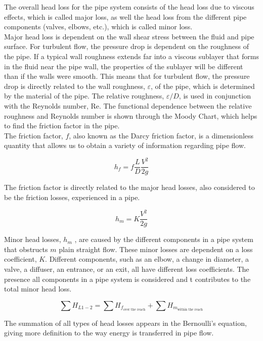 \documentclass{article}
\begin{document}
\noindent The overall head loss for the pipe system consists of the head loss due to viscous effects, which is called major loss, as well the head loss from the different pipe components (valves, elbows, etc.), which is called minor loss.\\

\noindent Major head loss is dependent on the wall shear stress between the fluid and pipe surface. For turbulent flow, the pressure drop is dependent on the roughness of the pipe. If a typical wall roughness extends far into a viscous sublayer that forms in the fluid near the pipe wall, the properties of the sublayer will be different than if the walls were smooth. This means that for turbulent flow, the pressure drop is directly related to the wall roughness, $\varepsilon$, of the pipe, which is determined by the material of the pipe. The relative roughness, $\varepsilon/D$, is used in conjunction with the Reynolds number, Re. The functional dependence between the relative roughness and Reynolds number is shown through the Moody Chart, which helps to find the friction factor in the pipe.\\

\noindent The friction factor, $f$, also known as the Darcy friction factor, is a dimensionless quantity that allows us to obtain a variety of information regarding pipe flow.

\[h_f=f\frac{L}{D}\frac{V^2}{2g}\]

\noindent The friction factor is directly related to the major head losses, also considered to be the friction losses, experienced in a pipe.

\[h_m=K\frac{V^2}{2g}\]

\noindent Minor head losses, $h_m$ , are caused by the different components in a pipe system that obstructs $m$ plain straight flow. These minor losses are dependent on a loss coefficient, $K$. Different components, such as an elbow, a change in diameter, a valve, a diffuser, an entrance, or an exit, all have different loss coefficients. The presence all components in a pipe system is considered and t contributes to the total minor head loss.

\[\sum H_{L1-2}=\sum H_{f_\text{over the reach}}+\sum H_{m_\text{within the reach}}\]

\noindent The summation of all types of head losses appears in the Bernoulli's equation, giving more definition to the way energy is transferred in pipe flow.\\
\end{document}
